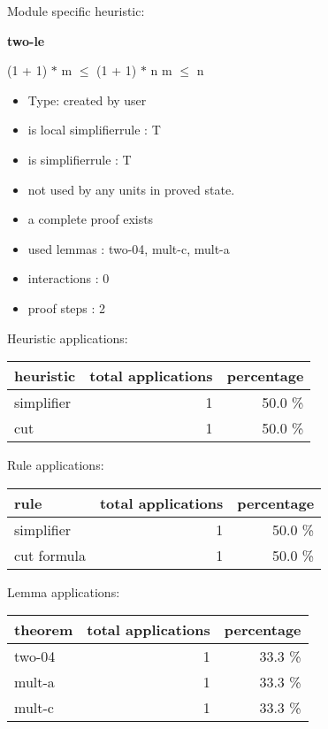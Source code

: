 \documentclass[a4paper]{article}
\begin{document}
Module specific heuristic:

\pagebreak

{\LARGE\bf two-le}\label{lemma-two-le}

\medskip

 \Fol (1 + 1) $*$ m $\le$ (1 + 1) $*$ n \Equiv m $\le$ n

\begin{itemize}

\item Type: created by user

\item is local simplifierrule : T
\item is simplifierrule : T
\item not used by any units in proved state.
\item       a complete proof exists
\item       used lemmas  : two-04, mult-c, mult-a
\item       interactions : 0
\item       proof steps  : 2
\end{itemize}

\medskip


Heuristic applications:

\begin{supertabular}{l|r|r}
heuristic	& total applications & percentage \\ \hline
simplifier & 1 & 50.0 \% \\
cut & 1 & 50.0 \% \\

\end{supertabular}

Rule applications:

\begin{supertabular}{l|r|r}
rule	        & total applications & percentage \\ \hline
simplifier & 1 & 50.0 \% \\
cut formula & 1 & 50.0 \% \\

\end{supertabular}

Lemma applications:

\begin{supertabular}{l|r|r}
theorem	        & total applications & percentage \\ \hline
two-04 & 1 & 33.3 \% \\
mult-a & 1 & 33.3 \% \\
mult-c & 1 & 33.3 \% \\

\end{supertabular}
\end{document}
